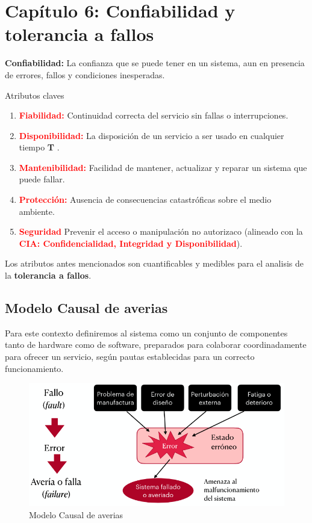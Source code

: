 \section{Capítulo 6: Confiabilidad y tolerancia a fallos}

\textbf{Confiabilidad:} La confianza que se puede tener en un sistema, aun en presencia de errores, fallos y condiciones inesperadas.

Atributos claves

\begin{enumerate}
    \item \textcolor{red}{\textbf{Fiabilidad:}} Continuidad correcta del servicio sin fallas o interrupciones.
    \item \textcolor{red}{\textbf{Disponibilidad:}} La disposición de un servicio a ser usado en cualquier tiempo \textbf{T} .
    \item \textcolor{red}{\textbf{Mantenibilidad:}} Facilidad de mantener, actualizar y reparar un sistema que puede fallar.
    \item \textcolor{red}{\textbf{Protección:}} Ausencia de consecuencias catastróficas sobre el medio ambiente.
    \item \textcolor{red}{\textbf{Seguridad}} Prevenir el acceso o manipulación no autorizaco (alineado con la \textcolor{red}{\textbf{CIA: Confidencialidad, Integridad y Disponibilidad}}).
\end{enumerate}

Los atributos antes mencionados son cuantificables y medibles para el analisis de la \textbf{tolerancia a fallos}.

\subsection{Modelo Causal de averias}
Para este contexto definiremos al sistema como un conjunto de componentes tanto de hardware como de software, preparados para colaborar coordinadamente para ofrecer un servicio, según pautas establecidas para un correcto funcionamiento.

\begin{figure}[H]
    \centering
    \includegraphics[width=0.48\linewidth]{img/Modelo_Causal_de_averias.png}
    \caption{Modelo Causal de averias}\label{fig:1761579857293}
\end{figure}

